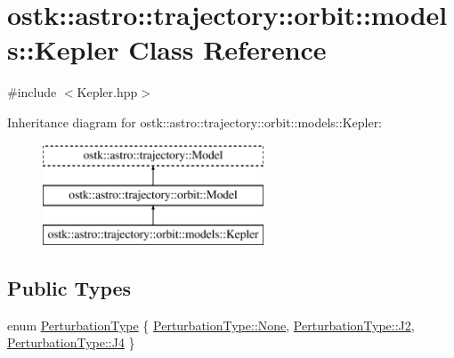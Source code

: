\hypertarget{classostk_1_1astro_1_1trajectory_1_1orbit_1_1models_1_1_kepler}{}\section{ostk\+:\+:astro\+:\+:trajectory\+:\+:orbit\+:\+:models\+:\+:Kepler Class Reference}
\label{classostk_1_1astro_1_1trajectory_1_1orbit_1_1models_1_1_kepler}


{\ttfamily \#include $<$Kepler.\+hpp$>$}

Inheritance diagram for ostk\+:\+:astro\+:\+:trajectory\+:\+:orbit\+:\+:models\+:\+:Kepler\+:\begin{figure}[H]
\begin{center}
\leavevmode
\includegraphics[height=3.000000cm]{classostk_1_1astro_1_1trajectory_1_1orbit_1_1models_1_1_kepler}
\end{center}
\end{figure}
\subsection*{Public Types}
\begin{DoxyCompactItemize}
\item 
enum \hyperlink{classostk_1_1astro_1_1trajectory_1_1orbit_1_1models_1_1_kepler_a3750f9177ff06a1938826e2c2881d5a9}{Perturbation\+Type} \{ \hyperlink{classostk_1_1astro_1_1trajectory_1_1orbit_1_1models_1_1_kepler_a3750f9177ff06a1938826e2c2881d5a9a6adf97f83acf6453d4a6a4b1070f3754}{Perturbation\+Type\+::\+None}, 
\hyperlink{classostk_1_1astro_1_1trajectory_1_1orbit_1_1models_1_1_kepler_a3750f9177ff06a1938826e2c2881d5a9a7f132d501fb9863844ab51697900d494}{Perturbation\+Type\+::\+J2}, 
\hyperlink{classostk_1_1astro_1_1trajectory_1_1orbit_1_1models_1_1_kepler_a3750f9177ff06a1938826e2c2881d5a9a0bf8a9e67aadee231938cadd6e85d369}{Perturbation\+Type\+::\+J4}
 \}
\end{DoxyCompactItemize}
